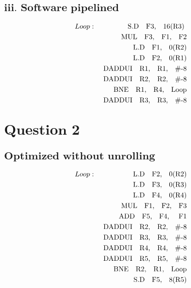 \documentclass{tufte-handout}
\begin{document}
	\subsection{$\textbf{iii.\ Software pipelined}$}
	\begin{eqnarray*}
		Loop : & & \mbox{ S.D\quad F3,\quad 16(R3) } \\
		       & & \mbox{ MUL\quad F3,\quad F1,\quad F2} \\
		       & & \mbox{ L.D\quad F1,\quad 0(R2)} \\
		       & & \mbox{ L.D\quad F2,\quad 0(R1)} \\
		       & & \mbox{ DADDUI\quad R1,\quad R1,\quad \#-8} \\
		       & & \mbox{ DADDUI\quad R2,\quad R2,\quad \#-8} \\
		       & & \mbox{ BNE\quad R1,\quad R4,\quad Loop} \\
		       & & \mbox{ DADDUI\quad R3,\quad R3,\quad \#-8} \\
	\end{eqnarray*}

\section{$\textbf{Question 2}$}
	\subsection{$\textbf{Optimized without unrolling}$}
		\begin{eqnarray*}
			Loop : & & \mbox{ L.D\quad F2,\quad 0(R2)} \\
			       & & \mbox{ L.D\quad F3,\quad 0(R3)} \\
			       & & \mbox{ L.D\quad F4,\quad 0(R4)} \\
			       & & \mbox{ MUL\quad F1,\quad F2,\quad F3} \\
			       & & \mbox{ ADD\quad F5,\quad F4, \quad F1} \\
			       & & \mbox{ DADDUI\quad R2,\quad R2,\quad \#-8} \\
			       & & \mbox{ DADDUI\quad R3,\quad R3,\quad \#-8} \\
			       & & \mbox{ DADDUI\quad R4,\quad R4,\quad \#-8} \\
			       & & \mbox{ DADDUI\quad R5,\quad R5,\quad \#-8} \\
			       & & \mbox{ BNE\quad R2,\quad R1,\quad Loop} \\
			       & & \mbox{ S.D\quad F5,\quad 8(R5)} \\
		\end{eqnarray*}
\end{document}

